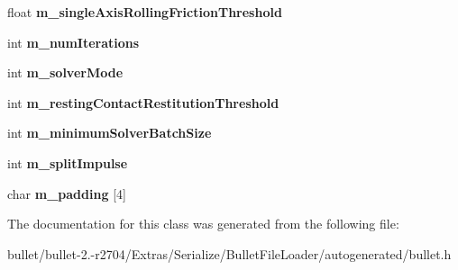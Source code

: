\begin{DoxyCompactItemize}
\item 
\hypertarget{class_bullet_1_1bt_contact_solver_info_float_data_ad7f9dc63ccbe2b430854c7fbae417b15}{float {\bfseries m\+\_\+single\+Axis\+Rolling\+Friction\+Threshold}}\label{class_bullet_1_1bt_contact_solver_info_float_data_ad7f9dc63ccbe2b430854c7fbae417b15}

\item 
\hypertarget{class_bullet_1_1bt_contact_solver_info_float_data_ad3cb452304036f3bf71a4359fb9b84c6}{int {\bfseries m\+\_\+num\+Iterations}}\label{class_bullet_1_1bt_contact_solver_info_float_data_ad3cb452304036f3bf71a4359fb9b84c6}

\item 
\hypertarget{class_bullet_1_1bt_contact_solver_info_float_data_a35c5ccbaafcc3fde30df5a765ed8f17d}{int {\bfseries m\+\_\+solver\+Mode}}\label{class_bullet_1_1bt_contact_solver_info_float_data_a35c5ccbaafcc3fde30df5a765ed8f17d}

\item 
\hypertarget{class_bullet_1_1bt_contact_solver_info_float_data_a1b76ceb335329ad2caa146ab01c61e04}{int {\bfseries m\+\_\+resting\+Contact\+Restitution\+Threshold}}\label{class_bullet_1_1bt_contact_solver_info_float_data_a1b76ceb335329ad2caa146ab01c61e04}

\item 
\hypertarget{class_bullet_1_1bt_contact_solver_info_float_data_abe48377e083b6dc69ec3223537653c36}{int {\bfseries m\+\_\+minimum\+Solver\+Batch\+Size}}\label{class_bullet_1_1bt_contact_solver_info_float_data_abe48377e083b6dc69ec3223537653c36}

\item 
\hypertarget{class_bullet_1_1bt_contact_solver_info_float_data_a09bdb1c9bf26dd1f05fc39e4f361a3c4}{int {\bfseries m\+\_\+split\+Impulse}}\label{class_bullet_1_1bt_contact_solver_info_float_data_a09bdb1c9bf26dd1f05fc39e4f361a3c4}

\item 
\hypertarget{class_bullet_1_1bt_contact_solver_info_float_data_af689d7ab93273568a24ef1d5168ecb69}{char {\bfseries m\+\_\+padding} \mbox{[}4\mbox{]}}\label{class_bullet_1_1bt_contact_solver_info_float_data_af689d7ab93273568a24ef1d5168ecb69}

\end{DoxyCompactItemize}


The documentation for this class was generated from the following file\+:\begin{DoxyCompactItemize}
\item 
bullet/bullet-\/2.-\/r2704/\+Extras/\+Serialize/\+Bullet\+File\+Loader/autogenerated/bullet.\+h\end{DoxyCompactItemize}
